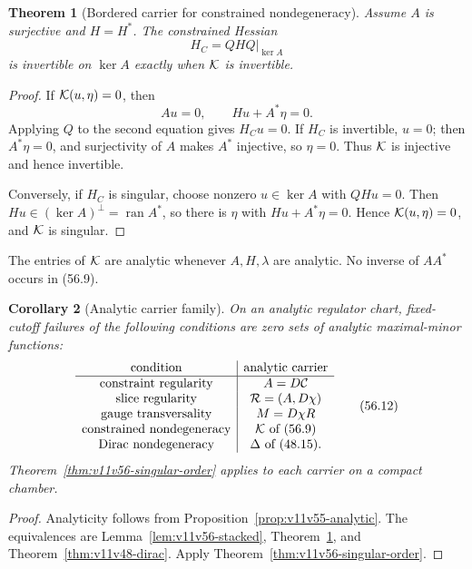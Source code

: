 \documentclass[11pt]{article}
\newtheorem{theorem}{Theorem}[section]
\newtheorem{corollary}[theorem]{Corollary}
\begin{document}
\begin{theorem}[Bordered carrier for constrained nondegeneracy]
\label{thm:v11v56-kkt}
Assume \(A\) is surjective and \(H=H^*\).  The constrained Hessian
\[
                         H_C=QH Q|_{\ker A}                   \tag{56.10}
\]
is invertible on \(\ker A\) exactly when \({\cal K}\) is invertible.
\end{theorem}

\begin{proof}
If \({\cal K}(u,\eta)=0\), then
\[
                         Au=0,\qquad Hu+A^*\eta=0.            \tag{56.11}
\]
Applying \(Q\) to the second equation gives \(H_Cu=0\).  If \(H_C\)
is invertible, \(u=0\); then \(A^*\eta=0\), and surjectivity of \(A\)
makes \(A^*\) injective, so \(\eta=0\).  Thus \({\cal K}\) is
injective and hence invertible.

Conversely, if \(H_C\) is singular, choose nonzero
\(u\in\ker A\) with \(QHu=0\).  Then
\(Hu\in(\ker A)^\perp=\operatorname{ran}A^*\), so there is
\(\eta\) with \(Hu+A^*\eta=0\).  Hence
\({\cal K}(u,\eta)=0\), and \({\cal K}\) is singular.
\end{proof}

The entries of \({\cal K}\) are analytic whenever \(A,H,\lambda\) are
analytic.  No inverse of \(AA^*\) occurs in (56.9).

\begin{corollary}[Analytic carrier family]
\label{cor:v11v56-carriers}
On an analytic regulator chart, fixed-cutoff failures of the following
conditions are zero sets of analytic maximal-minor functions:
\[
\begin{array}{c|c}
\text{condition}&\text{analytic carrier}\\ \hline
\text{constraint regularity}&A=D{\cal C}\\
\text{slice regularity}&{\cal R}=(A,D\chi)\\
\text{gauge transversality}&M=D\chi R\\
\text{constrained nondegeneracy}&{\cal K}\text{ of (56.9)}\\
\text{Dirac nondegeneracy}&\Delta\text{ of (48.15)}.
\end{array}                                                     \tag{56.12}
\]
Theorem~\ref{thm:v11v56-singular-order} applies to each carrier on a
compact chamber.
\end{corollary}

\begin{proof}
Analyticity follows from Proposition~\ref{prop:v11v55-analytic}.
The equivalences are Lemma~\ref{lem:v11v56-stacked},
Theorem~\ref{thm:v11v56-kkt}, and
Theorem~\ref{thm:v11v48-dirac}.  Apply
Theorem~\ref{thm:v11v56-singular-order}.
\end{proof}
\end{document}
